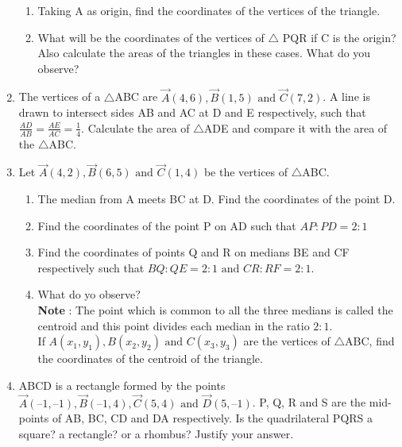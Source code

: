 \documentclass[12pt]{article}
\begin{document}
\begin{enumerate}
\begin{enumerate}
\item Taking A as origin, find the coordinates of the vertices of the triangle.\\
\item What will be the coordinates of the vertices of $\triangle$ PQR if C is the origin?\\
Also calculate the areas of the triangles in these cases. What do you observe?
\end{enumerate}


\item The vertices of a $\triangle$ABC are $\vec{A}(4,6), \vec{B}(1,5) \text{ and } \vec{C}(7,2)$. A line is drawn to intersect sides AB and AC at D and E respectively, such that $\frac{AD}{AB} = \frac{AE}{AC} = \frac{1}{4}$. Calculate the area of $\triangle$ADE and compare it with the area of the $\triangle$ABC.

\item Let $\vec{A}(4, 2), \vec{B}(6, 5) \text{ and } \vec{C}(1, 4)$ be the vertices of $\triangle$ABC.\\

\begin{enumerate}
\item The median from A meets BC at D. Find the coordinates of the point D.\\
\item Find the coordinates of the point P on AD such that $AP : PD = 2 : 1$\\
\item Find the coordinates of points Q and R on medians BE and CF respectively such that $BQ : QE = 2 : 1 \text{ and } CR : RF = 2 : 1$.\\
\item What do yo observe?\\
\textbf{Note} : The point which is common to all the three medians is called the centroid and this point divides each median in the ratio $2 : 1$.\\
If $A(x_{1},y_{1}), B(x_{2},y_{2}) \text{ and } C(x_{3},y_{3})$ are the vertices of $\triangle$ABC, find the coordinates of the centroid of the triangle.
\end{enumerate}


\item ABCD is a rectangle formed by the points $\vec{A}(–1, –1), \vec{B}(– 1, 4), \vec{C}(5, 4) \text{ and } \vec{D}(5, – 1)$. P, Q, R and S are the mid-points of AB, BC, CD and DA respectively. Is the quadrilateral PQRS a square? a rectangle? or a rhombus? Justify your answer.


\end{enumerate}
\end{document}
